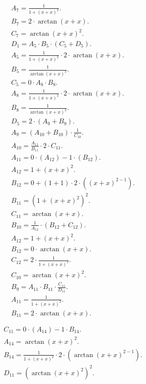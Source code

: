 \documentclass[12pt,a4paper]{extreport}
\begin{document}
\begin{multline}
\\
A_{7} = \frac{1}{1 + (x + x) ^ {2}}.\\
B_{7} = 2 \cdot \arctan(x + x).\\
C_{7} = \arctan(x + x) ^ {2}.\\
D_{1} = A_{5} \cdot B_{5} \cdot (C_{5} + D_{5}).\\
A_{5} = \frac{1}{1 + (x + x) ^ {2}} \cdot 2 \cdot \arctan(x + x).\\
B_{5} = \frac{1}{\arctan(x + x) ^ {2}}.\\
C_{5} = 0 \cdot A_{8} \cdot B_{8}.\\
A_{8} = \frac{1}{1 + (x + x) ^ {2}} \cdot 2 \cdot \arctan(x + x).\\
B_{8} = \frac{1}{\arctan(x + x) ^ {2}}.\\
D_{5} = 2 \cdot (A_{9} + B_{9}).\\
A_{9} = (A_{10} + B_{10}) \cdot \frac{1}{C_{10}}.\\
A_{10} = \frac{A_{11}}{B_{11}} \cdot 2 \cdot C_{11}.\\
A_{11} = 0 \cdot (A_{12}) - 1 \cdot (B_{12}).\\
A_{12} = 1 + (x + x) ^ {2}.\\
B_{12} = 0 + (1 + 1) \cdot 2 \cdot ((x + x) ^ {2 - 1}).\\
B_{11} = (1 + (x + x) ^ {2}) ^ {2}.\\
C_{11} = \arctan(x + x).\\
B_{10} = \frac{1}{A_{12}} \cdot (B_{12} + C_{12}).\\
A_{12} = 1 + (x + x) ^ {2}.\\
B_{12} = 0 \cdot \arctan(x + x).\\
C_{12} = 2 \cdot \frac{1}{1 + (x + x) ^ {2}}.\\
C_{10} = \arctan(x + x) ^ {2}.\\
B_{9} = A_{11} \cdot B_{11} \cdot \frac{C_{11}}{D_{11}}.\\
A_{11} = \frac{1}{1 + (x + x) ^ {2}}.\\
B_{11} = 2 \cdot \arctan(x + x).\\
\end{multline}
\begin{multline}
\\
C_{11} = 0 \cdot (A_{14}) - 1 \cdot B_{14}.\\
A_{14} = \arctan(x + x) ^ {2}.\\
B_{14} = \frac{1}{1 + (x + x) ^ {2}} \cdot 2 \cdot (\arctan(x + x) ^ {2 - 1}).\\
D_{11} = (\arctan(x + x) ^ {2}) ^ {2}.\\
\end{multline}
\end{document}

